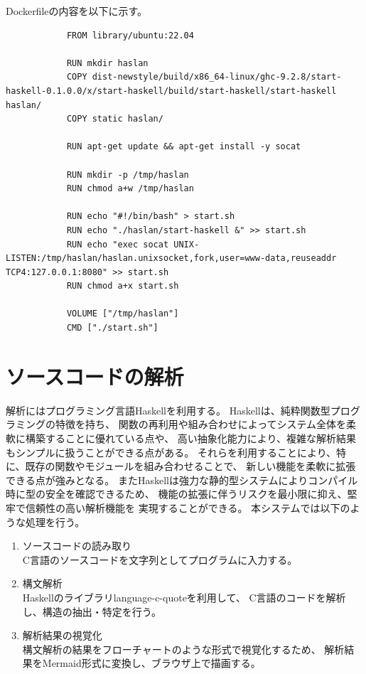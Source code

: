 \documentclass{cssspaper}
\begin{document}
        Dockerfileの内容を以下に示す。
        \begin{lstlisting}
            FROM library/ubuntu:22.04

            RUN mkdir haslan
            COPY dist-newstyle/build/x86_64-linux/ghc-9.2.8/start-haskell-0.1.0.0/x/start-haskell/build/start-haskell/start-haskell haslan/
            COPY static haslan/

            RUN apt-get update && apt-get install -y socat

            RUN mkdir -p /tmp/haslan
            RUN chmod a+w /tmp/haslan

            RUN echo "#!/bin/bash" > start.sh
            RUN echo "./haslan/start-haskell &" >> start.sh
            RUN echo "exec socat UNIX-LISTEN:/tmp/haslan/haslan.unixsocket,fork,user=www-data,reuseaddr TCP4:127.0.0.1:8080" >> start.sh
            RUN chmod a+x start.sh

            VOLUME ["/tmp/haslan"]
            CMD ["./start.sh"]
        \end{lstlisting}

        \section{ソースコードの解析}
        解析にはプログラミング言語Haskellを利用する。
        Haskellは、純粋関数型プログラミングの特徴を持ち、
        関数の再利用や組み合わせによってシステム全体を柔軟に構築することに優れている点や、
        高い抽象化能力により、複雑な解析結果もシンプルに扱うことができる点がある。
        それらを利用することにより、特に、既存の関数やモジュールを組み合わせることで、
        新しい機能を柔軟に拡張できる点が強みとなる。
        またHaskellは強力な静的型システムによりコンパイル時に型の安全を確認できるため、
        機能の拡張に伴うリスクを最小限に抑え、堅牢で信頼性の高い解析機能を
        実現することができる。
        本システムでは以下のような処理を行う。
        \begin{enumerate}
            \item ソースコードの読み取り\\
            C言語のソースコードを文字列としてプログラムに入力する。
            \item 構文解析\\
            Haskellのライブラリlanguage-c-quoteを利用して、
            C言語のコードを解析し、構造の抽出・特定を行う。  
            \item 解析結果の視覚化\\
            構文解析の結果をフローチャートのような形式で視覚化するため、
            解析結果をMermaid形式に変換し、ブラウザ上で描画する。  
        \end{enumerate}
\end{document}
